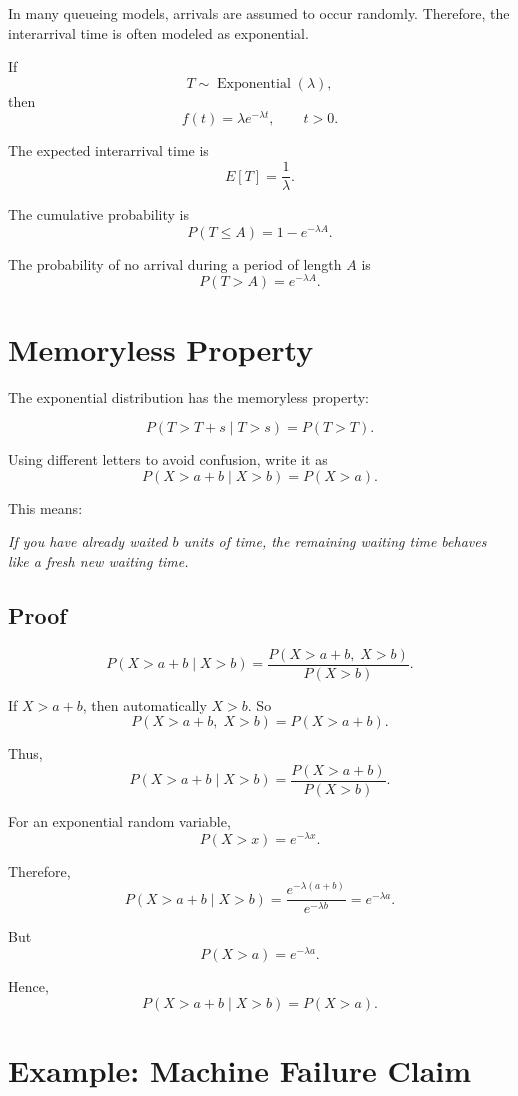 \documentclass[12pt]{article}
\begin{document}
In many queueing models, arrivals are assumed to occur randomly. Therefore, the interarrival time is often modeled as exponential.

If
\[
T\sim \operatorname{Exponential}(\lambda),
\]
then
\[
f(t)=\lambda e^{-\lambda t},\qquad t>0.
\]

The expected interarrival time is
\[
E[T]=\frac{1}{\lambda}.
\]

The cumulative probability is
\[
P(T\leq A)=1-e^{-\lambda A}.
\]

The probability of no arrival during a period of length \(A\) is
\[
P(T>A)=e^{-\lambda A}.
\]

\section{Memoryless Property}

The exponential distribution has the memoryless property:

\[
P(T>T+s\mid T>s)=P(T>T).
\]

Using different letters to avoid confusion, write it as
\[
P(X>a+b\mid X>b)=P(X>a).
\]

This means:

\begin{center}
\textit{If you have already waited \(b\) units of time, the remaining waiting time behaves like a fresh new waiting time.}
\end{center}

\subsection*{Proof}

\[
P(X>a+b\mid X>b)
=
\frac{P(X>a+b,\;X>b)}{P(X>b)}.
\]

If \(X>a+b\), then automatically \(X>b\). So
\[
P(X>a+b,\;X>b)=P(X>a+b).
\]

Thus,
\[
P(X>a+b\mid X>b)
=
\frac{P(X>a+b)}{P(X>b)}.
\]

For an exponential random variable,
\[
P(X>x)=e^{-\lambda x}.
\]

Therefore,
\[
P(X>a+b\mid X>b)
=
\frac{e^{-\lambda(a+b)}}{e^{-\lambda b}}
=
e^{-\lambda a}.
\]

But
\[
P(X>a)=e^{-\lambda a}.
\]

Hence,
\[
\boxed{
P(X>a+b\mid X>b)=P(X>a).
}
\]

\section{Example: Machine Failure Claim}
\end{document}
